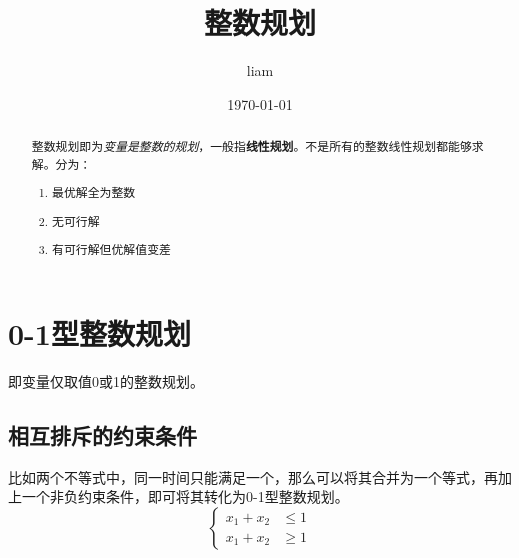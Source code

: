 \documentclass[UTF8]{ctexart}
\title{整数规划}
\author{liam}
\date{\today}
\begin{document}
\maketitle

\begin{abstract}
整数规划即为\textit{变量是整数的规划}，一般指\textbf{线性规划}。不是所有的整数线性规划都能够求解。分为：
\begin{enumerate}
	\item 最优解全为整数
	\item 无可行解
	\item 有可行解但优解值变差
\end{enumerate}
\end{abstract}

\section{0-1型整数规划}
即变量仅取值0或1的整数规划。
\subsection{相互排斥的约束条件}
比如两个不等式中，同一时间只能满足一个，那么可以将其合并为一个等式，再加上一个非负约束条件，即可将其转化为0-1型整数规划。
\begin{equation}
\left\{
	\begin{aligned}
		x_1 + x_2 &\leq 1 \\
		x_1 + x_2 &\geq 1
	\end{aligned}
\right.
\end{equation}
\end{document}
